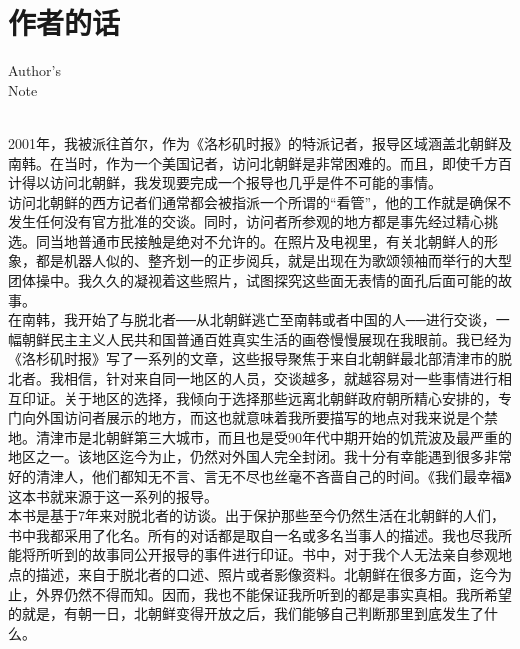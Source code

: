 \fancyhead[RO]{{\tiny{\textcolor{Gray}{\FA \ }}}\thepage}
\fancyhead[LE]{{\tiny{\textcolor{Gray}{\FA \ }}}\thepage}
\fancyfoot[LE,RO]{}
\fancyfoot[LO,CE]{}
\fancyfoot[CO,RE]{}
\chapter*{作者的话}
\vspace{5mm}
\begin{flushright}
	\textcolor{PinYinColor}{\EN \huge{Author's\\
	Note\\
	\ \\}}
\end{flushright}
2001年，我被派往首尔，作为《洛杉矶时报》的特派记者，报导区域涵盖北朝鲜及南韩。在当时，作为一个美国记者，访问北朝鲜是非常困难的。而且，即使千方百计得以访问北朝鲜，我发现要完成一个报导也几乎是件不可能的事情。\\

访问北朝鲜的西方记者们通常都会被指派一个所谓的“看管”，他的工作就是确保不发生任何没有官方批准的交谈。同时，访问者所参观的地方都是事先经过精心挑选。同当地普通市民接触是绝对不允许的。在照片及电视里，有关北朝鲜人的形象，都是机器人似的、整齐划一的正步阅兵，就是出现在为歌颂领袖而举行的大型团体操中。我久久的凝视着这些照片，试图探究这些面无表情的面孔后面可能的故事。\\

在南韩，我开始了与脱北者──从北朝鲜逃亡至南韩或者中国的人──进行交谈，一幅朝鲜民主主义人民共和国普通百姓真实生活的画卷慢慢展现在我眼前。我已经为《洛杉矶时报》写了一系列的文章，这些报导聚焦于来自北朝鲜最北部清津市的脱北者。我相信，针对来自同一地区的人员，交谈越多，就越容易对一些事情进行相互印证。关于地区的选择，我倾向于选择那些远离北朝鲜政府朝所精心安排的，专门向外国访问者展示的地方，而这也就意味着我所要描写的地点对我来说是个禁地。清津市是北朝鲜第三大城市，而且也是受90年代中期开始的饥荒波及最严重的地区之一。该地区迄今为止，仍然对外国人完全封闭。我十分有幸能遇到很多非常好的清津人，他们都知无不言、言无不尽也丝毫不吝啬自己的时间。《我们最幸福》这本书就来源于这一系列的报导。\\

本书是基于7年来对脱北者的访谈。出于保护那些至今仍然生活在北朝鲜的人们，书中我都采用了化名。所有的对话都是取自一名或多名当事人的描述。我也尽我所能将所听到的故事同公开报导的事件进行印证。书中，对于我个人无法亲自参观地点的描述，来自于脱北者的口述、照片或者影像资料。北朝鲜在很多方面，迄今为止，外界仍然不得而知。因而，我也不能保证我所听到的都是事实真相。我所希望的就是，有朝一日，北朝鲜变得开放之后，我们能够自己判断那里到底发生了什么。\\
